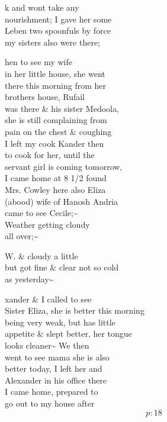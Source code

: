 \documentclass{report}
\begin{document}





	\par{
 	k and wont take any\ \\nourishment; I gave her some\ \\Leben two spoonfuls by force\ \\my sisters also were there;\ \\
	}

	\par{
 	hen to see my wife\ \\in her little house, she went\ \\there this morning from her\ \\brothers house, Rufail\ \\was there \& his sister Medoola,\ \\she is still complaining from\ \\pain on the chest \& coughing\ \\I left my cook Kander then\ \\to cook for her, until the\ \\servant girl is coming tomorrow,\ \\I came home at 8 1/2 found\ \\Mrs. Cowley here also Eliza\ \\(abood) wife of Hanosh Andria\ \\came to see Cecile;\~{}\ \\Weather getting cloudy\ \\all over;\~{}\ \\
	}


	\par{
 	W. \& cloudy a little\ \\but got fine \& clear not so cold\ \\as yesterday\~{}\ \\
	}

	\par{
 	xander \& I called to see\ \\Sister Eliza, she is better this morning\ \\being very weak, but has little\ \\appetite \& slept better, her tongue\ \\looks cleaner\~{} We then\ \\went to see mama she is also\ \\better today, I left her and\ \\Alexander in his office there\ \\I came home, prepared to\ \\go out to my house after\ \\
  \[p: 18 \]

	}
\end{document}
